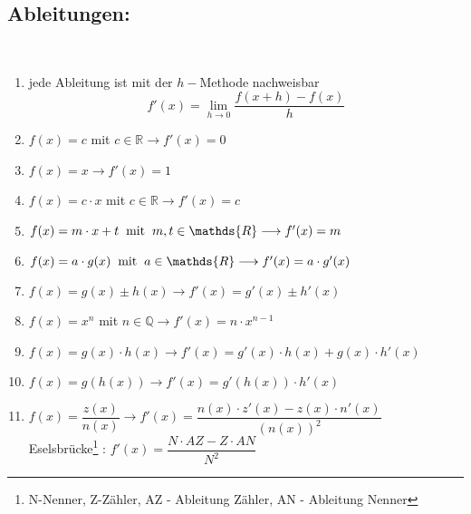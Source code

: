 \documentclass[a4paper,twocolumn,10pt]{onepgnote}
\begin{document}
\subsection{Ableitungen:}\\
\begin{enumerate}
\item jede Ableitung ist mit der $h-$Methode nachweisbar $$f'(x) = \lim \limits_{h\longrightarrow 0} \frac{f(x+h) - f(x)}{h}$$
\item $f(x)= c$ mit $c \in\mathds{R} \longrightarrow f'(x) = 0$\hfill\\
\item $f(x)= x  \longrightarrow f'(x) = 1$\\
\item $f(x) = c\cdot x $ mit $c\in\mathds{R}\longrightarrow f'(x) = c$ \\
\item $f(x) = m\cdot x + t  \hspace{0.2cm}\text{mit} \hspace{0.2cm} m,t \in \mathds{R}\longrightarrow f'(x) = m$\\
\item $f(x) = a\cdot g(x)\hspace{0.2cm}\text{mit} \hspace{0.2cm} a \in \mathds{R} \longrightarrow f'(x) = a\cdot g'(x)$ \\
\item $f(x)= g(x) \pm h(x) \longrightarrow f'(x) = g'(x)\pm h'(x)$\\
\item $f(x) = x^n$ mit $n\in \mathds{Q} \longrightarrow f'(x) = n\cdot x^{n-1}$\\
\item $f(x) = g(x) \cdot h(x) \longrightarrow f'(x) = g'(x) \cdot h(x) + g(x) \cdot h'(x)$\\
\item $f(x) = g(h(x)) \longrightarrow f'(x) = g'(h(x)) \cdot h'(x)$\\
\item $f(x) = \dfrac{z(x)}{n(x)} \longrightarrow f'(x) = \dfrac{n(x)\cdot z'(x) - z(x) \cdot n'(x)}{(n(x))^2}$\\ Eselsbrücke\footnote{N-Nenner, Z-Zähler, AZ - Ableitung Zähler, AN - Ableitung Nenner} : $f'(x)=\dfrac{N\cdot AZ-Z\cdot AN}{N^2}$
\end{enumerate}
\end{document}
